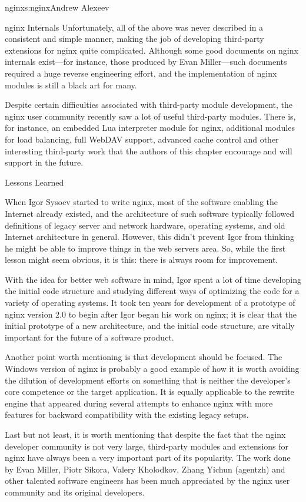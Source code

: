 \begin{aosachapter}{nginx}{s:nginx}{Andrew Alexeev}
\begin{aosasect1}{nginx Internals}
Unfortunately, all of the above was never described in a consistent and
simple manner, making the job of developing third-party extensions for
nginx quite complicated. Although some good documents on nginx
internals exist---for instance, those produced by Evan Miller---such
documents required a huge reverse engineering effort, and the
implementation of nginx modules is still a black art for many.

Despite certain difficulties associated with third-party module
development, the nginx user community recently saw a lot of useful
third-party modules. There is, for instance, an embedded Lua
interpreter module for nginx, additional modules for load balancing,
full WebDAV support, advanced cache control and other interesting
third-party work that the authors of this chapter encourage and will
support in the future.

\end{aosasect1}

\begin{aosasect1}{Lessons Learned}

When Igor Sysoev started to write nginx, most of the software enabling
the Internet already existed, and the architecture of such software
typically followed definitions of legacy server and network hardware,
operating systems, and old Internet architecture in general. However,
this didn't prevent Igor from thinking he might be able to improve
things in the web servers area. So, while the first lesson might seem
obvious, it is this: there is always room for improvement.

With the idea for better web software in mind, Igor spent
a lot of time developing the initial code structure and studying
different ways of optimizing the code for a variety of operating
systems. It took ten years for development of a prototype of nginx version
2.0 to begin after Igor began his work on nginx; it is clear that the
initial prototype of a new architecture, and the initial code
structure, are vitally important for the future of a software product.

Another point worth mentioning is that development should be
focused. The Windows version of nginx is probably a good example of
how it is worth avoiding the dilution of development efforts on
something that is neither the developer's core competence or the
target application. It is equally applicable to the rewrite engine
that appeared during several attempts to enhance nginx with more
features for backward compatibility with the existing legacy setups.

Last but not least, it is worth mentioning that despite the fact that
the nginx developer community is not very large, third-party modules
and extensions for nginx have always been a very important part of its
popularity. The work done by Evan Miller, Piotr Sikora, Valery
Kholodkov, Zhang Yichun (agentzh) and other talented software
engineers has been much appreciated by the nginx user community and
its original developers.

\end{aosasect1}

\end{aosachapter}
